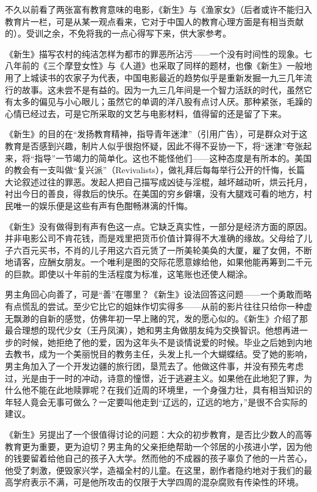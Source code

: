 \par 不久以前看了两张富有教育意味的电影，《新生》与《渔家女》（后者或许不能归入教育片一栏，可是从某一观点看来，它对于中国人的教育心理方面是有相当贡献的）。受训之余，不免将我的一点心得写下来，供大家参考。
\par 《新生》描写农村的纯洁怎样为都市的罪恶所沾污——一个没有时间性的现象。七八年前的《三个摩登女性》与《人道》也采取了同样的题材，也像《新生》一般地用了上城读书的农家子为代表，中国电影最近的趋势似乎是重新发掘一九三几年流行的故事。这未尝不是有益的。因为一九三几年间是一个智力活跃的时代，虽然它有太多的偏见与小心眼儿；虽然它的单调的洋八股有点讨人厌。那种紧张，毛躁的心情已经过去，可是它所采取的文艺与电影材料，值得留的还是留了下来。
\par 《新生》的目的在“发扬教育精神，指导青年迷津”（引用广告），可是群众对于这教育是否感到兴趣，制片人似乎很抱怀疑，因此不得不妥协一下，将“迷津”夸张起来，将“指导”一节竭力的简单化。这也不能怪他们——这种态度是有所本的。美国的教会有一支叫做“复兴派”（Revivalists），做礼拜后每每举行公开的忏悔，长篇大论叙述过往的罪恶。发起人把自己描写成凶徒与淫棍，越坏越动听，烘云托月，衬出今日的善良，得救后的快乐。在美国的穷乡僻壤，没有大腿戏可看的地方，村民唯一的娱乐便是这些有声有色酣畅淋漓的忏悔。
\par 《新生》没有做得到有声有色这一点。它缺乏真实性，一部分是经济方面的原因。并非电影公司不肯花钱，而是戏里把货币价值计算得不大准确的缘故。父母给了儿子六百元买书，不肖的儿子用这六百元赁了一所美轮美奂的大厦，雇了女佣，不断地请客，应酬女朋友。一个唯利是图的交际花愿意嫁给他，如果他能再筹到二千元的巨款。即使以十年前的生活程度为标准，这笔账也还使人糊涂。
\par 男主角回心向善了，可是“善”在哪里？《新生》设法回答这问题——一个勇敢而略有点慌乱的尝试。至少它比它的姐妹作切实得多——从前的影片往往只给你一种虚无飘渺的自新的感觉，仿佛年初一早上赌的咒，发的愿心似的。《新生》介绍了那最合理想的现代少女（王丹凤演），她和男主角做朋友纯为交换智识。他想再进一步的时候，她拒绝了他的爱，因为这年头不是谈情说爱的时候。毕业之后她到内地去教书，成为一个美丽悦目的教务主任，头发上扎一个大蝴蝶结。受了她的影响，男主角加入了一个开发边疆的旅行团，垦荒去了。他做这件事，并没有预先考虑过，光是由于一时的冲动，诗意的憧憬，近于逃避主义。如果他在此地犯了罪，为什么他不能在此地赎罪呢？在我们近周的环境里，一个身强力壮，具有相当知识的年轻人竟会无事可做么？一定要叫他走到“辽远的，辽远的地方，”是很不合实际的建议。
\par 《新生》另提出了一个很值得讨论的问题：大众的初步教育，是否比少数人的高等教育更为重要，更为迫切？男主角的父亲拒绝帮助一个邻居的小孩进小学，因为他的钱要留着给他自己的孩子入大学。然而他的不成器的孩子辜负了他的一片苦心，他受了刺激，便毁家兴学，造福全村的儿童。在这里，剧作者隐约地对于我们的最高学府表示不满，可是他所攻击的仅限于大学四周的混杂腐败有传染性的环境。

